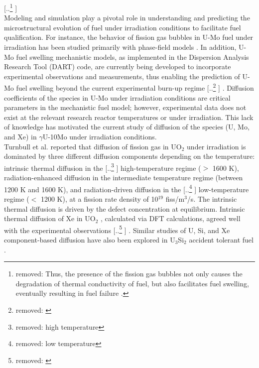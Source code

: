 \documentclass[preprint,12pt]{elsarticle}
\providecommand{\DIFadd}[1]{{\protect\color{blue} \sf #1}} %
\providecommand{\DIFdel}[1]{{\protect\color{red} [..\footnote{removed: #1} ]}} %
\providecommand{\DIFaddbegin}{} %
\providecommand{\DIFaddend}{} %
\providecommand{\DIFdelbegin}{} %
\providecommand{\DIFdelend}{} %
\newcommand{\DIFscaledelfig}{0.5}
\newlength{\DIFdelgraphicswidth} %
\newlength{\DIFdelgraphicsheight} %
\newcommand{\DIFaddincludegraphics}[2][]{{\color{blue}\fbox{\DIFOincludegraphics[#1]{#2}}}} %
\newcommand{\DIFdelincludegraphics}[2][]{%
\sbox{\DIFdelgraphicsbox}{\DIFOincludegraphics[#1]{#2}}%
\settoboxwidth{\DIFdelgraphicswidth}{\DIFdelgraphicsbox} %
\settoboxtotalheight{\DIFdelgraphicsheight}{\DIFdelgraphicsbox} %
\scalebox{\DIFscaledelfig}{%
\parbox[b]{\DIFdelgraphicswidth}{\usebox{\DIFdelgraphicsbox}\\[-\baselineskip] \rule{\DIFdelgraphicswidth}{0em}}\llap{\resizebox{\DIFdelgraphicswidth}{\DIFdelgraphicsheight}{%
\setlength{\unitlength}{\DIFdelgraphicswidth}%
\begin{picture}(1,1)%
\thicklines\linethickness{2pt} %
{\color[rgb]{1,0,0}\put(0,0){\framebox(1,1){}}}%
{\color[rgb]{1,0,0}\put(0,0){\line( 1,1){1}}}%
{\color[rgb]{1,0,0}\put(0,1){\line(1,-1){1}}}%
\end{picture}%
}\hspace*{3pt}}} %
} %
\DeclareRobustCommand{\DIFaddbegin}{\DIFOaddbegin \let\includegraphics\DIFaddincludegraphics} %
\DeclareRobustCommand{\DIFaddend}{\DIFOaddend \let\includegraphics\DIFOincludegraphics} %
\DeclareRobustCommand{\DIFdelbegin}{\DIFOdelbegin \let\includegraphics\DIFdelincludegraphics} %
\DeclareRobustCommand{\DIFdelend}{\DIFOaddend \let\includegraphics\DIFOincludegraphics} %
\begin{document}
\DIFdelbegin \DIFdel{Thus, the presence of the fission gas bubbles not only causes the degradation of thermal conductivity of fuel, but also facilitates fuel swelling, eventually resulting in fuel failure \cite{hu2015assessment, huber2018thermal}.}\DIFdelend \\
\indent Modeling and simulation play a pivotal role in understanding and predicting the microstructural evolution of fuel under irradiation conditions to facilitate fuel qualification. For instance, the behavior of fission gas bubbles in U-Mo fuel under irradiation has been studied primarily with phase-field models \cite{hu2009phase, hu2016formation, liang2018three, liang2018fission}. In addition, U-Mo fuel swelling mechanistic models, as implemented in the Dispersion Analysis Research Tool (DART) code, are currently being developed to incorporate experimental observations and measurements, thus enabling the prediction of U-Mo fuel swelling beyond the current experimental burn-up regime \DIFdelbegin \DIFdel{\cite{ye2015dart}}\DIFdelend \DIFaddbegin \DIFadd{\cite{ye2015dart, ye2018modelling}}\DIFaddend . Diffusion coefficients of the species in U-Mo under irradiation conditions are critical parameters in the mechanistic fuel model; however, experimental data does not exist at the relevant research reactor temperatures or under irradiation. This lack of knowledge has motivated the current study of diffusion of the species (U, Mo, and Xe) in $\gamma$U-10Mo under irradiation conditions.\\ 
\indent Turnbull et al. \cite{turnbull1982diffusion} reported that diffusion of fission gas in UO$_{2}$ under irradiation is dominated by three different diffusion components depending on the temperature: intrinsic thermal diffusion in the \DIFdelbegin \DIFdel{high temperature }\DIFdelend \DIFaddbegin \DIFadd{high-temperature }\DIFaddend regime ($>$ 1600 K), radiation-enhanced diffusion in the intermediate temperature regime (between 1200 K and 1600 K), and radiation-driven diffusion in the \DIFdelbegin \DIFdel{low temperature }\DIFdelend \DIFaddbegin \DIFadd{low-temperature }\DIFaddend regime ($<$ 1200 K), at a fission rate density of 10$^{19}$ fiss/m$^{3}$/s. The intrinsic thermal diffusion is driven by the defect concentration at equilibrium. Intrinsic thermal diffusion of Xe in UO$_{2}$ \cite{perriot2019atomistic}, calculated via DFT calculations, agreed well with the experimental observations \DIFdelbegin \DIFdel{\cite{turnbull1982diffusion, davis1963aere}}\DIFdelend \DIFaddbegin \DIFadd{\cite{turnbull1982diffusion}}\DIFaddend . Similar studies of U, Si, and Xe component-based diffusion have also been explored in U$_3$Si$_2$ accident tolerant fuel \cite{cooper2021irradiation, beeler2021radiation}. 
\DIFdelbegin %
\end{document}
